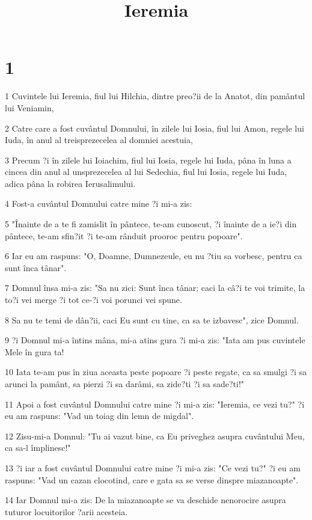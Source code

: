 

\title{Ieremia}


\chapter{1}

\par 1 Cuvintele lui Ieremia, fiul lui Hilchia, dintre preo?ii de la Anatot, din pamântul lui Veniamin,
\par 2 Catre care a fost cuvântul Domnului, în zilele lui Iosia, fiul lui Amon, regele lui Iuda, în anul al treisprezecelea al domniei acestuia,
\par 3 Precum ?i în zilele lui Ioiachim, fiul lui Iosia, regele lui Iuda, pâna în luna a cincea din anul al unsprezecelea al lui Sedechia, fiul lui Iosia, regele lui Iuda, adica pâna la robirea Ierusalimului.
\par 4 Fost-a cuvântul Domnului catre mine ?i mi-a zis:
\par 5 "Înainte de a te fi zamislit în pântece, te-am cunoscut, ?i înainte de a ie?i din pântece, te-am sfin?it ?i te-am rânduit prooroc pentru popoare".
\par 6 Iar eu am raspuns: "O, Doamne, Dumnezeule, eu nu ?tiu sa vorbesc, pentru ca sunt înca tânar".
\par 7 Domnul însa mi-a zis: "Sa nu zici: Sunt înca tânar; caci la câ?i te voi trimite, la to?i vei merge ?i tot ce-?i voi porunci vei spune.
\par 8 Sa nu te temi de dân?ii, caci Eu sunt cu tine, ca sa te izbavesc", zice Domnul.
\par 9 ?i Domnul mi-a întins mâna, mi-a atins gura ?i mi-a zis: "Iata am pus cuvintele Mele în gura ta!
\par 10 Iata te-am pus în ziua aceasta peste popoare ?i peste regate, ca sa smulgi ?i sa arunci la pamânt, sa pierzi ?i sa darâmi, sa zide?ti ?i sa sade?ti!"
\par 11 Apoi a fost cuvântul Domnului catre mine ?i mi-a zis: "Ieremia, ce vezi tu?" ?i eu am raspuns: "Vad un toiag din lemn de migdal".
\par 12 Zisu-mi-a Domnul: "Tu ai vazut bine, ca Eu priveghez asupra cuvântului Meu, ca sa-l împlinesc!"
\par 13 ?i iar a fost cuvântul Domnului catre mine ?i mi-a zis: "Ce vezi tu?" ?i eu am raspuns: "Vad un cazan clocotind, care e gata sa se verse dinspre miazanoapte".
\par 14 Iar Domnul mi-a zis: De la miazanoapte se va deschide nenorocire asupra tuturor locuitorilor ?arii acesteia.
